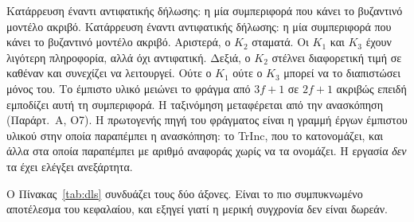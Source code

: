 %
{Κατάρρευση έναντι αντιφατικής δήλωσης: η μία συμπεριφορά που κάνει το
βυζαντινό μοντέλο ακριβό.}%
{Κατάρρευση έναντι αντιφατικής δήλωσης: η μία συμπεριφορά που κάνει το
βυζαντινό μοντέλο ακριβό. Αριστερά, ο $K_2$ σταματά. Οι $K_1$ και $K_3$
έχουν λιγότερη πληροφορία, αλλά όχι αντιφατική. Δεξιά, ο $K_2$ στέλνει
διαφορετική τιμή σε καθέναν και συνεχίζει να λειτουργεί. Ούτε ο $K_1$
ούτε ο $K_3$ μπορεί να το διαπιστώσει μόνος του. Το έμπιστο υλικό
μειώνει το φράγμα από $3f{+}1$ σε $2f{+}1$ ακριβώς επειδή εμποδίζει αυτή
τη συμπεριφορά. Η ταξινόμηση μεταφέρεται από την ανασκόπηση
\cite{amiri2024bedrock} (Παράρτ.~A, O7). Η πρωτογενής πηγή του φράγματος
είναι η γραμμή έργων έμπιστου υλικού στην οποία παραπέμπει η ανασκόπηση:
το TrInc, που το κατονομάζει, και άλλα στα οποία παραπέμπει με αριθμό
αναφοράς χωρίς να τα ονομάζει. Η εργασία \emph{δεν} τα έχει ελέγξει
ανεξάρτητα.}%
{}

Ο Πίνακας~\ref{tab:dls} συνδυάζει τους δύο άξονες. Είναι το πιο
συμπυκνωμένο αποτέλεσμα του κεφαλαίου, και εξηγεί γιατί η μερική
συγχρονία δεν είναι δωρεάν.

